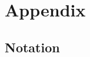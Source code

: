\documentclass[
    a4paper,
    11pt,              %
    DIV10,             %
    BCOR12mm,           %
    headsepline,       %
    cleardoublepage=empty,  %
    listof=totoc,       %
    bibliography=totocnumbered,  %
    chapterprefix,     %
    appendixprefix,
    numbers=noenddot,  %
    captions=tableheading,  %
]{scrbook}             %
\theoremstyle{break}
\begin{document}
\appendix
\chapter{Appendix}

\section{Notation}

\backmatter          %
\listoffigures
\listoftables




\end{document}
